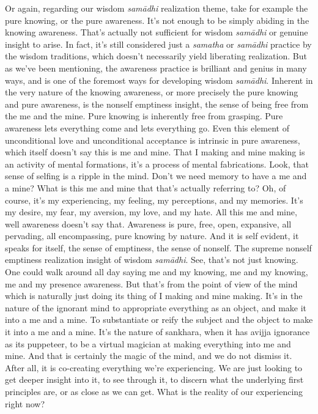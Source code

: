 \documentclass[12pt,openany]{book}
\begin{document}
Or again, regarding our wisdom \textit{samādhi} realization theme, take for example the pure knowing, or the pure awareness. It's not enough to be simply abiding in the knowing awareness. That’s actually not sufficient for wisdom \textit{samādhi} or genuine insight to arise. In fact, it's still considered just a \textit{samatha} or \textit{samādhi} practice by the wisdom traditions, which doesn't necessarily yield liberating realization. But as we've been mentioning, the awareness practice is brilliant and genius in many ways, and is one of the foremost ways for developing wisdom \textit{samādhi}. Inherent in the very nature of the knowing awareness, or more precisely the pure knowing and pure awareness, is the nonself emptiness insight,  the sense of being free from the me and the mine. Pure knowing is inherently free from grasping. Pure awareness lets everything come and lets everything go. Even this element of unconditional love and unconditional acceptance is intrinsic in pure awareness, which itself doesn't say this is me and mine. That I making and mine making is an activity of mental formations, it's a process of mental fabrications. Look, that sense of selfing is a ripple in the mind. Don't we need memory to have a me and a mine? What is this me and mine that that's actually referring to? Oh, of course, it's my experiencing, my feeling, my perceptions, and my memories. It's my desire, my fear, my aversion, my love, and my hate. All this me and mine, well awareness doesn't say that. Awareness is pure, free, open, expansive, all pervading, all encompassing, pure knowing by nature. And it is self evident, it speaks for itself, the sense of emptiness, the sense of nonself. The supreme nonself emptiness realization insight of wisdom \textit{samādhi}. See, that's not just knowing. One could walk around all day saying me and my knowing, me and my knowing, me and my presence awareness. But that's from the point of view of the mind which is naturally just doing its thing of I making and mine making. It’s in the nature of the ignorant mind to appropriate everything as an object, and make it into a me and a mine. To substantiate or reify the subject and the object to make it into a me and a mine. It’s the nature of sankhara, when it has avijja ignorance as its puppeteer, to be a virtual magician at making everything into me and mine. And that is certainly the magic of the mind, and we do not dismiss it. After all, it is co-creating everything we're experiencing. We are just looking to get deeper insight into it, to see through it, to discern what the underlying first principles are, or as close as we can get. What is the reality of our experiencing right now?
\end{document}
